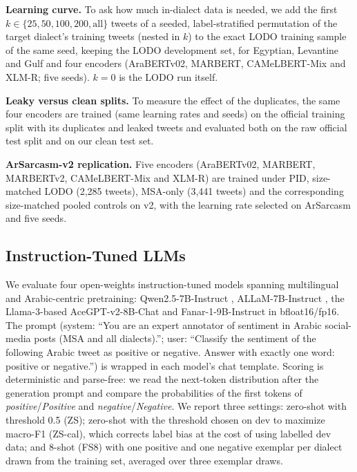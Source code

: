 \documentclass[11pt]{article}
\begin{document}
\textbf{Learning curve.} To ask how much in-dialect data is needed, we add the first $k\in\{25,50,100,200,\text{all}\}$ tweets of a seeded, label-stratified permutation of the target dialect's training tweets (nested in $k$) to the exact LODO training sample of the same seed, keeping the LODO development set, for Egyptian, Levantine and Gulf and four encoders (AraBERTv02, MARBERT, CAMeLBERT-Mix and XLM-R; five seeds). $k{=}0$ is the LODO run itself.

\textbf{Leaky versus clean splits.} To measure the effect of the duplicates, the same four encoders are trained (same learning rates and seeds) on the official training split with its duplicates and leaked tweets and evaluated both on the raw official test split and on our clean test set.

\textbf{ArSarcasm-v2 replication.} Five encoders (AraBERTv02, MARBERT, MARBERTv2, CAMeLBERT-Mix and XLM-R) are trained under PID, size-matched LODO (2,285 tweets), MSA-only (3,441 tweets) and the corresponding size-matched pooled controls on v2, with the learning rate selected on ArSarcasm and five seeds.

\subsection{Instruction-Tuned LLMs}
\label{sec:llm_method}
We evaluate four open-weights instruction-tuned models spanning multilingual and Arabic-centric pretraining: Qwen2.5-7B-Instruct \cite{qwen2025qwen25}, ALLaM-7B-Instruct \cite{bari2025allam}, the Llama-3-based AceGPT-v2-8B-Chat \cite{huang2024acegpt} and Fanar-1-9B-Instruct \cite{fanar2025} in bfloat16/fp16. The prompt (system: ``You are an expert annotator of sentiment in Arabic social-media posts (MSA and all dialects).''; user: ``Classify the sentiment of the following Arabic tweet as positive or negative. Answer with exactly one word: positive or negative.'') is wrapped in each model's chat template. Scoring is deterministic and parse-free: we read the next-token distribution after the generation prompt and compare the probabilities of the first tokens of \emph{positive}/\emph{Positive} and \emph{negative}/\emph{Negative}. We report three settings: zero-shot with threshold 0.5 (ZS); zero-shot with the threshold chosen on dev to maximize macro-F1 (ZS-cal), which corrects label bias at the cost of using labelled dev data; and 8-shot (FS8) with one positive and one negative exemplar per dialect drawn from the training set, averaged over three exemplar draws.
\end{document}
